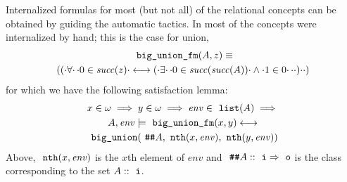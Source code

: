 Internalized formulas for most (but not all) of the relational
concepts can be obtained by guiding the automatic tactics. In
 most of the concepts were internalized by
hand; this is the case for union,
\begin{multline*}
  \isatt{big{\uscore}union{\uscore}fm}(A,z) \equiv \\
  (({\cdot}\forall{\cdot}\,{\cdot}0 \in \mathit{succ}(z){\cdot} \longleftrightarrow
  ({\cdot}\exists{\cdot}\,{\cdot}0 \in \mathit{succ}(\mathit{succ}(A)){\cdot} \land {\cdot}1 \in
  0{\cdot}\,{\cdot}{\cdot}){\cdot}{\cdot})
\end{multline*}
for which we have the following satisfaction lemma:
\begin{multline}\label{eq:sats_big_union_fm}
  x \in \omega \implies y \in \omega \implies \mathit{env} \in \isatt{list}(A)
  \implies \\
  A, \mathit{env} \models \isatt{big{\uscore}union{\uscore}fm}(x,y)%
  \longleftrightarrow \\
  \isatt{big{\uscore}union}(\isatt{\#\#} A, \isatt{nth}(x,
  \mathit{env}), \isatt{nth}(y, \mathit{env}))
\end{multline}
Above, $\isatt{nth}(x,\mathit{env})$ is the $x$th element of $\mathit{env}$
and $\isatt{\#\#}A::\tyi\fun \tyo$ is the class corresponding to the
set $A::\tyi$.

